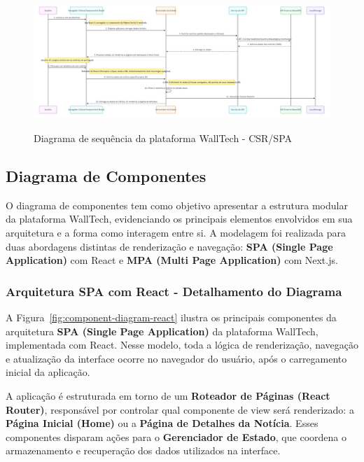 \begin{figure}[H]
  \centering
  \caption{Diagrama de sequência da plataforma WallTech - CSR/SPA}
  \includegraphics[width=1\textwidth]{media/wall_tech_detail_sequence_diagram.jpeg}
  \label{fig:sequence-diagram-details}
\end{figure}




\subsection{Diagrama de Componentes}
\label{subsec:diagrama-componentes}

O diagrama de componentes tem como objetivo apresentar a estrutura modular da plataforma WallTech, evidenciando os principais elementos envolvidos em sua arquitetura e a forma como interagem entre si. A modelagem foi realizada para duas abordagens distintas de renderização e navegação: \textbf{SPA (Single Page Application)} com React e \textbf{MPA (Multi Page Application)} com Next.js.

\subsubsection{Arquitetura SPA com React - Detalhamento do Diagrama}

A Figura~\ref{fig:component-diagram-react} ilustra os principais componentes da arquitetura \textbf{SPA (Single Page Application)} da plataforma WallTech, implementada com React. Nesse modelo, toda a lógica de renderização, navegação e atualização da interface ocorre no navegador do usuário, após o carregamento inicial da aplicação.

A aplicação é estruturada em torno de um \textbf{Roteador de Páginas (React Router)}, responsável por controlar qual componente de view será renderizado: a \textbf{Página Inicial (Home)} ou a \textbf{Página de Detalhes da Notícia}. Esses componentes disparam ações para o \textbf{Gerenciador de Estado}, que coordena o armazenamento e recuperação dos dados utilizados na interface.

